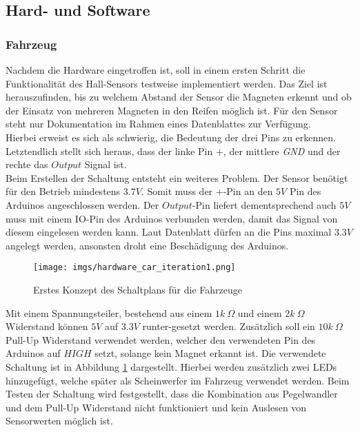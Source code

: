 \documentclass[.../Dokumentation.tex]{subfiles}
\begin{document}
\subsection{Hard- und Software}
\label{sec-ita1-hardware}

\subsubsection*{Fahrzeug}
Nachdem die Hardware eingetroffen ist, soll in einem ersten Schritt 
die Funktionalität des Hall-Sensors testweise implementiert werden. Das Ziel 
ist herauszufinden, bis zu welchem Abstand der Sensor die Magneten erkennt und 
ob der Einsatz von mehreren Magneten in den Reifen möglich ist. Für den Sensor 
steht nur Dokumentation im Rahmen eines Datenblattes zur Verfügung.\\
Hierbei erweist es sich als schwierig, die Bedeutung der drei Pins zu 
erkennen. Letztendlich stellt sich heraus, dass der linke Pin $+$, der 
mittlere \textit{GND} und der rechte das $Output$ Signal ist.\\
Beim Erstellen der Schaltung entsteht ein weiteres Problem. Der Sensor benötigt für den Betrieb mindestens $3.7V$. Somit muss der $+$-Pin an den $5V$ Pin des 
Arduinos angeschlossen werden. Der $Output$-Pin liefert dementsprechend auch $5V$ muss mit einem IO-Pin des Arduinos verbunden werden, damit das 
Signal von diesem eingelesen werden kann. Laut Datenblatt dürfen an die Pins maximal $3.3V$ angelegt werden, ansonsten droht eine Beschädigung des Arduinos.
\begin{figure}[H]
\begin{center}
    \texttt{[image: imgs/hardware\_car\_iteration1.png]}
    \caption{Erstes Konzept des Schaltplans für die Fahrzeuge}
    \label{fig-hardware-car-iteration1}
\end{center}
\end{figure}
\noindent
Mit einem Spannungsteiler, bestehend aus einem $1k\ \Omega$ und einem $2k\ \Omega$ Widerstand können $5V$ 
auf $3.3V$ runter-gesetzt werden. Zusätzlich soll ein 
$10k\ \Omega$ Pull-Up Widerstand verwendet werden, welcher den verwendeten Pin 
des Arduinos auf $HIGH$ setzt, solange kein Magnet erkannt ist. Die verwendete Schaltung ist in Abbildung \ref{fig-hardware-car-iteration1} dargestellt. 
Hierbei werden zusätzlich zwei LEDs hinzugefügt, welche später als Scheinwerfer im Fahrzeug verwendet werden. Beim Testen der Schaltung wird festgestellt, dass die Kombination aus Pegelwandler und dem Pull-Up Widerstand nicht funktioniert und kein Auslesen von Sensorwerten möglich ist.
\end{document}
